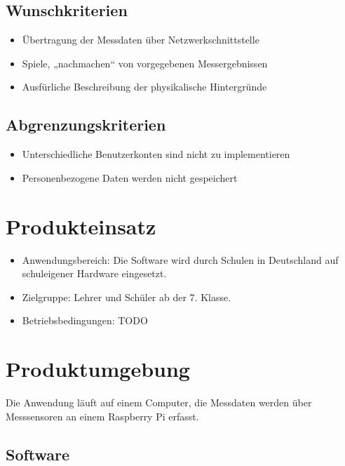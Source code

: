 \documentclass[parskip=full]{scrartcl}
\begin{document}
\subsection{Wunschkriterien}

\begin{itemize}

\item Übertragung der Messdaten über Netzwerkschnittstelle
\item Spiele, „nachmachen“ von vorgegebenen Messergebnissen
\item Ausfürliche Beschreibung der physikalische Hintergründe

 \end{itemize}

\subsection{Abgrenzungskriterien}

\begin{itemize}

\item Unterschiedliche Benutzerkonten sind nicht zu implementieren
\item Personenbezogene Daten werden nicht gespeichert

 \end{itemize}

\section{Produkteinsatz}

\begin{itemize}

\item Anwendungsbereich: Die Software wird durch Schulen in Deutschland auf schuleigener Hardware eingesetzt.
\item Zielgruppe: Lehrer und Schüler ab der 7. Klasse.
\item Betriebsbedingungen: TODO

\end{itemize}

\section{Produktumgebung}

Die Anwendung läuft auf einem Computer, die Messdaten werden über Messsensoren an einem Raspberry Pi erfasst.

\subsection{Software}
\end{document}
